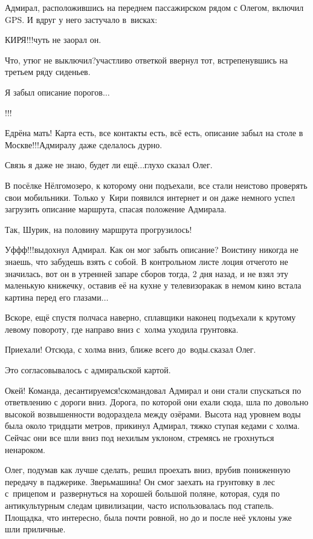 Адмирал, расположившись на переднем пассажирском рядом с Олегом, включил GPS. И вдруг у него застучало в~висках:

\diagdash КИРЯ!!!\mdash чуть не заорал он.

\diagdash Что, утюг не выключил?\mdash участливо ответкой ввернул тот, встрепенувшись на третьем ряду сиденьев.

\diagdash Я забыл описание порогов$\ldots$

\diagdash !!!

\diagdash Едрёна мать! Карта есть, все контакты есть, всё есть, описание забыл на столе в Москве!!!\mdash Адмиралу даже сделалось дурно.

\diagdash Связь я даже не знаю, будет ли ещё$\ldots$\mdash глухо сказал Олег.

В посёлке Нёлгомозеро, к которому они подъехали, все стали неистово проверять свои мобильники. Только у~Кири появился интернет и он даже немного успел загрузить описание маршрута, спасая положение Адмирала.

\diagdash Так, Шурик, на половину маршрута прогрузилось!

\diagdash Уф\sdash ф\sdash ф!!!\mdash выдохнул Адмирал. Как он мог забыть описание? Воистину никогда не знаешь, что забудешь взять с собой. В контрольном листе лоция отчего\sdash то не значилась, вот он в утренней запаре сборов тогда, 2 дня назад, и не взял эту маленькую книжечку, оставив её на кухне у телевизора\mdash как в немом кино встала картина перед его глазами$\ldots$

Вскоре, ещё спустя полчаса наверно, сплавщики наконец подъехали к крутому левому повороту, где направо вниз с~холма уходила грунтовка. 

\diagdash Приехали! Отсюда, с холма вниз, ближе всего до~воды.\mdash сказал Олег.

Это согласовывалось с адмиральской картой. 

\diagdash Окей! Команда, десантируемся!\mdash скомандовал Адмирал и они стали спускаться по ответвлению с дороги вниз. Дорога, по которой они ехали сюда, шла по довольно высокой возвышенности водораздела между озёрами. Высота над уровнем воды была около тридцати метров, прикинул Адмирал, тяжко ступая кедами с холма. Сейчас они все шли вниз под нехилым уклоном, стремясь не грохнуться ненароком.

Олег, подумав как лучше сделать, решил проехать вниз, врубив пониженную передачу в паджерике. Зверь\nobreakdash\sdash\nobreakdash машина! Он смог заехать на грунтовку в лес с~прицепом и~развернуться на хорошей большой поляне, которая, судя по антикультурным следам цивилизации, часто использовалась под стапель. Площадка, что интересно, была почти ровной, но до и после неё уклоны уже шли приличные.

